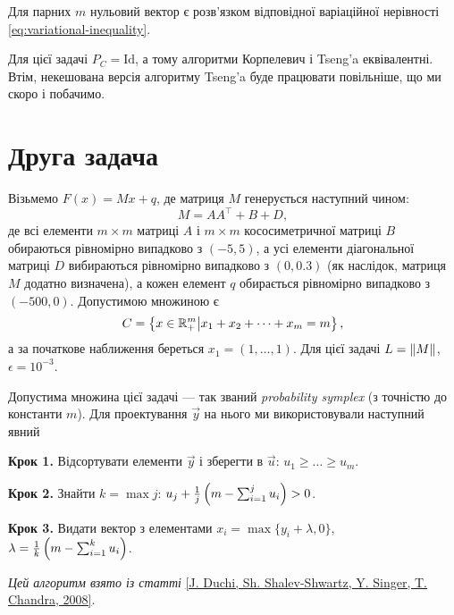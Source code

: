 Для парних $m$ нульовий вектор є розв'язком відповідної варіаційної нерівності \eqref{eq:variational-inequality}.

\begin{remark}
    Для цієї задачі $P_C = \text{Id}$, а тому алгоритми Корпелевич і Tseng'a еквівалентні. Втім, некешована версія алгоритму Tseng'a буде працювати повільніше, що ми скоро і побачимо.
\end{remark}


\section{Друга задача}

Візьмемо $F(x) = M x + q$, де матриця $M$ генерується наступний чином:
\begin{equation}
    M = A A^\intercal + B + D,
\end{equation}
де всі елементи $m \times m$ матриці $A$ і $m \times m$ кососиметричної матриці $B$ обираються рівномірно випадково з $(-5, 5)$, а усі елементи діагональної матриці $D$ вибираються рівномірно випадково з $(0, 0.3)$ (як наслідок, матриця $M$ додатно визначена), а кожен елемент $q$ обирається рівномірно випадково з $(-500, 0)$. Допустимою множиною є 
\begin{equation}
    C = \left\{ x \in \mathbb{R}_+^m \middle| x_1 + x_2 + \dots + x_m = m \right\},
\end{equation}
а за початкове наближення береться $x_1 = (1, \dots, 1)$. Для цієї задачі $L = \left\| M \right\|$, $\epsilon = 10^{-3}$. \medskip

Допустима множина цієї задачі --- так званий \emph{probability symplex} (з точністю до константи $m$). Для проектування $\vec y$ на нього ми використовували наступний явний
\begin{algorithm}\nothing

    \textbf{Крок 1.} Відсортувати елементи $\vec y$ і зберегти в $\vec u$: $u_1 \ge \dots \ge u_m$. \medskip
        
    \textbf{Крок 2.} Знайти $k = \max j$: $u_j + \frac{1}{j} \left( m - \operatorname*{\sum}_{i = 1}^j u_i \right) > 0$. \medskip
        
    \textbf{Крок 3.} Видати вектор з елементами $x_i = \max\{y_i + \lambda, 0\}$, $\lambda = \frac{1}{k} \left( m - \operatorname*{\sum}_{i = 1}^k u_i \right)$.
\end{algorithm}

\emph{Цей алгоритм взято із статті} \href{https://stanford.edu/~jduchi/projects/DuchiShSiCh08.pdf}{[J. Duchi, Sh. Shalev-Shwartz, Y. Singer, T. Chandra, 2008]}.

